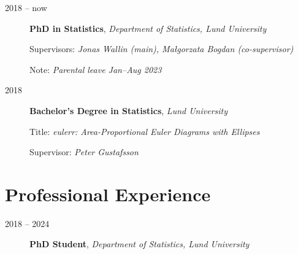 \documentclass[english,a4paper]{article}
\renewcommand*{%
  \mkbibnamegiven
}[1]{\ifitemannotation{highlight}{\textbf{#1}}{#1}}
\renewcommand*{%
  \mkbibnamefamily
}[1]{\ifitemannotation{highlight}{\textbf{#1}}{#1}}
\begin{document}
\begin{description}
  \item[2018 -- now] {
        \textbf{PhD in Statistics}, \emph{Department of Statistics, Lund
          University}

        Supervisors: \emph{Jonas Wallin (main), Małgorzata Bogdan (co-supervisor)}

        Note: \emph{Parental leave Jan--Aug 2023}

        }

  \item[2018] {
        \textbf{Bachelor's Degree in Statistics}, \emph{Lund University}

        Title: \emph{eulerr: Area-Proportional Euler Diagrams with Ellipses}

        Supervisor: \emph{Peter Gustafsson}
        }

\end{description}

\section{Professional Experience}

\begin{description}
  \item[2018 -- 2024] {
        \textbf{PhD Student}, \emph{Department of Statistics, Lund University}

        }
\end{description}
\end{document}
